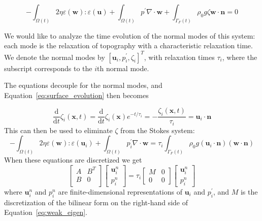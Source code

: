 \documentclass[preprint,12pt,authoryear]{elsarticle}
\begin{document}
\begin{equation}
-\int_{\Omega(t)} 2 \eta \varepsilon( \mathbf{w} ) \colon \varepsilon( \mathbf{u} ) + \int_{\Omega(t)} p^\prime \nabla \cdot \mathbf{w} 
+ \int_{\Gamma_F(t)} \rho_0 g \zeta  \mathbf{w} \cdot \mathbf{n} = 0 
\end{equation}

We would like to analyze the time evolution of the normal modes of this system: each mode 
is the relaxation of topography with a characteristic relaxation time.  
We denote the normal modes by $\left[ \mathbf{u}_i, p^\prime_i, \zeta_i \right]^T$, with
relaxation times $\tau_i$, where the subscript corresponds to the $i$th normal mode.

The equations decouple for the normal modes, and Equation~\eqref{eq:surface_evolution} then becomes

\begin{equation}
\frac {\text{d}}{\text{d} t} \zeta_i(\mathbf{x},t) = \frac{\text{d}}{\text{d}t} \zeta_i(\mathbf{x})e^{-t/\tau_i} = -\frac{\zeta_i(\mathbf{x},t)}{\tau_i} = \mathbf{u}_i \cdot \mathbf{n}
\end{equation}
This can then be used to eliminate $\zeta$ from the Stokes system:
\begin{equation}
-\int_{\Omega(t)} 2 \eta \varepsilon( \mathbf{w} ) \colon \varepsilon( \mathbf{u}_i ) + \int_{\Omega(t)} p^\prime_i \nabla \cdot \mathbf{w} 
= \tau_i \int_{\Gamma_F(t)} \rho_0 g (\mathbf{u}_i \cdot \mathbf{n} ) (\mathbf{w} \cdot \mathbf{n})
\label{eq:weak_eigen}
\end{equation}
When these equations are discretized \citep[e.g.][]{kronbichler2012high} we get
\begin{equation}
\begin{bmatrix}
A & B^T \\
B & 0 \\
\end{bmatrix}
\begin{bmatrix}
\mathbf{u}^n_i \\
p^n_i
\end{bmatrix}
=
\tau_i
\begin{bmatrix}
M & 0 \\
0 & 0
\end{bmatrix}
\begin{bmatrix}
\mathbf{u}^n_i \\
p^n_i
\end{bmatrix}
\label{eq:generalized_eigenvalue}
\end{equation}
where $\mathbf{u}^n_i$ and $p^n_i$ are finite-dimensional representations of $\mathbf{u}_i$ and $p^\prime_i$,
and $M$ is the discretization of the bilinear form on the right-hand side of Equation~\eqref{eq:weak_eigen}.
\end{document}
